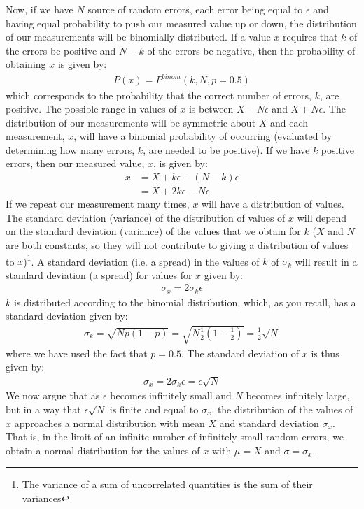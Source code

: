 Now, if we have $N$ source of random errors, each error being equal to $\epsilon$ and having equal probability to push our measured value up or down, the distribution of our measurements will be binomially distributed. If a value $x$ requires that $k$ of the errors be positive and $N-k$ of the errors be negative, then the probability of obtaining $x$ is given by:
\begin{align*}
P(x)=P^{binom}(k,N,p=0.5)
\end{align*}
which corresponds to the probability that the correct number of errors, $k$, are positive. The possible range in values of $x$ is between $X-N\epsilon$ and $X+N\epsilon$. The distribution of our measurements will be symmetric about $X$ and each measurement, $x$, will have a binomial probability of occurring (evaluated by determining how many errors, $k$, are needed to be positive). If we have $k$ positive errors, then our measured value, $x$, is given by:
\begin{align}
x&=X+k\epsilon-(N-k)\epsilon\\
&=X+2k\epsilon-N\epsilon
\end{align}
If we repeat our measurement many times, $x$ will have a distribution of values. The standard deviation (variance) of the distribution of values of $x$ will depend on the standard deviation (variance) of the values that we obtain for $k$ ($X$ and $N$ are both constants, so they will not contribute to giving a distribution of values to $x$)\footnote{The variance of a sum of uncorrelated quantities is the sum of their variances}. A standard deviation (i.e. a spread) in the values of $k$ of $\sigma_k$ will result in a standard deviation (a spread) for values for $x$ given by:
\begin{align}
\sigma_x=2 \sigma_k \epsilon
\end{align}
$k$ is distributed according to the binomial distribution, which, as you recall, has a standard deviation given by:
\begin{align}
\sigma_k=\sqrt{Np(1-p)}=\sqrt{N\frac{1}{2}(1-\frac{1}{2})}=\frac{1}{2}\sqrt{N}
\end{align}
where we have used the fact that $p=0.5$. The standard deviation of $x$ is thus given by:
\begin{align}
\sigma_x=2 \sigma_k \epsilon=\epsilon\sqrt{N}
\end{align}
We now argue that as $\epsilon$ becomes infinitely small and $N$ becomes infinitely large, but in a way that $\epsilon\sqrt{N}$ is finite and equal to $\sigma_x$, the distribution of the values of $x$ approaches a normal distribution with mean $X$ and standard deviation $\sigma_x$. That is, in the limit of an infinite number of infinitely small random errors, we obtain a normal distribution for the values of $x$ with $\mu=X$ and $\sigma=\sigma_x$. 


